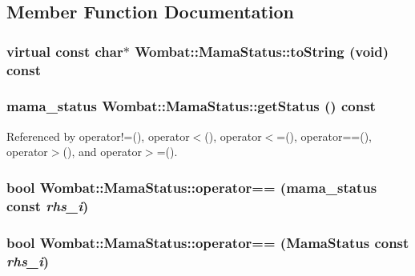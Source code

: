 \subsection{Member Function Documentation}
\hypertarget{classWombat_1_1MamaStatus_a02ff04f38d5416f4b2bfa53482e3bf5f}{
\subsubsection[{toString}]{\setlength{\rightskip}{0pt plus 5cm}virtual const char$\ast$ Wombat::MamaStatus::toString (void) const}}
\label{classWombat_1_1MamaStatus_a02ff04f38d5416f4b2bfa53482e3bf5f}
\hypertarget{classWombat_1_1MamaStatus_aa81706c7b6fb7c0c3e7022a65dc98900}{
\subsubsection[{getStatus}]{\setlength{\rightskip}{0pt plus 5cm}mama\_\-status Wombat::MamaStatus::getStatus () const}}
\label{classWombat_1_1MamaStatus_aa81706c7b6fb7c0c3e7022a65dc98900}


Referenced by operator!=(), operator$<$(), operator$<$=(), operator==(), operator$>$(), and operator$>$=().\hypertarget{classWombat_1_1MamaStatus_a71076ff4eff0cc5d407e2fdda8f5da45}{
\subsubsection[{operator==}]{\setlength{\rightskip}{0pt plus 5cm}bool Wombat::MamaStatus::operator== (mama\_\-status const  {\em rhs\_\-i})}}
\label{classWombat_1_1MamaStatus_a71076ff4eff0cc5d407e2fdda8f5da45}
\hypertarget{classWombat_1_1MamaStatus_acbe0311e7bbbfe7e56b8af5a64e76f7f}{
\subsubsection[{operator==}]{\setlength{\rightskip}{0pt plus 5cm}bool Wombat::MamaStatus::operator== ({\bf MamaStatus} const  {\em rhs\_\-i})}}
\label{classWombat_1_1MamaStatus_acbe0311e7bbbfe7e56b8af5a64e76f7f}


